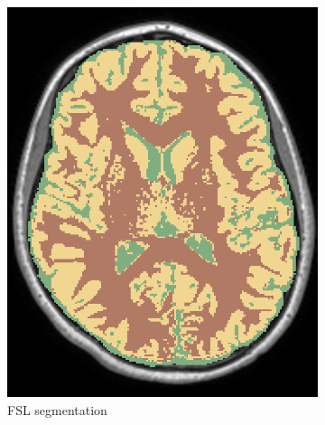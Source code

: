 \documentclass{standalone}
\begin{document}
\begin{figure}[H]
\begin{subfigure}[b]{0.325\textwidth}
             \includegraphics[scale=0.213]{img/Chap3/FSL_SEG48.png}
             \caption{FSL segmentation}
        \end{subfigure}
        \hfill
        \begin{subfigure}[b]{0.325\textwidth}

\end{subfigure}
\end{figure}
\end{document}
